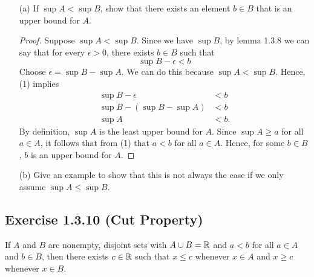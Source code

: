 \begin{enumerate}
    
    \item[(a)] If \( \sup A < \sup B \), show that there exists an element \( b \in B \) that is an upper bound for \( A \). 
    \begin{proof}
        Suppose \( \sup A < \sup B \). Since we have \( \sup B \), by lemma 1.3.8 we can say that for every \( \epsilon > 0 \), there exists \( b \in B \) such that 
        \[ \sup B - \epsilon < b \tag{1} \] 
        Choose \( \epsilon = \sup B - \sup A \). We can do this because \( \sup A < \sup B \). Hence, (1) implies 
        \begin{align*} 
            \sup B - \epsilon &< b \\
            \sup B - (\sup B - \sup A ) &< b \\ 
            \sup A &< b.
        \end{align*}  
        By definition, \( \sup A \) is the least upper bound for \(A \). Since \( \sup A \geq a\) for all \( a \in A\), it follows that 
        from (1) that \( a < b \) for all \( a \in A\). Hence, for some \( b \in B \), \( b \) is an upper bound for \( A \).    




    \end{proof}
    
    \item[(b)] Give an example to show that this is not always the case if we only assume \( \sup A \leq \sup B \). 


\end{enumerate}

    \subsection{Exercise 1.3.10 (Cut Property)}
    If \( A \) and \( B \) are nonempty, disjoint sets with \( A \cup B = \mathbb{R} \) and \( a < b \) for all \( a \in A \) and \( b \in B \), then there exists \( c \in \mathbb{R} \) such that \( x \leq c \) whenever \( x \in A \) and \( x \geq c \) whenever \( x \in B \). 
   
